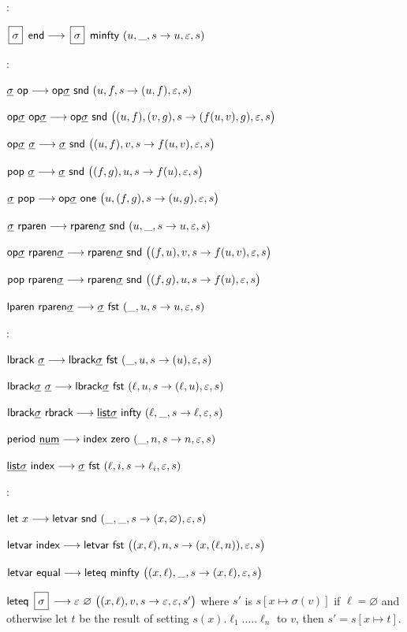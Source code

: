 \documentclass{llncs}
\begin{document}
:
\blist
    \item $\isig\ \eend \longto \isig\ \minfty\ (u,\_,s\to u,\epsilon,s)$
\elist

:
\blist
    \item $\tsig\ \op \longto \op\tsig\ \snd\ (u,f,s\to(u,f),\epsilon,s)$
    \item $\op\tsig\ \op\tsig \longto \op\tsig\ \snd\ \bigl((u,f),(v,g),s\to (f(u,v),g),\epsilon,s\bigr)$
    \item $\op\tsig\ \tsig \longto \tsig\ \snd\ \bigl((u,f),v,s\to f(u,v),\epsilon,s\bigr)$
    \item $\Pop\ \tsig \longto \tsig\ \snd\ \bigl((f,g),u,s\to f(u),\epsilon,s\bigr)$
    \item $\tsig\ \Pop \longto \op\tsig\ {\sf one}\ \bigl(u,(f,g),s\to(u,g),\epsilon,s\bigr)$
    \item $\tsig\ \rparen \longto \rparen\tsig\ \snd\ (u,\_,s\to u,\epsilon,s)$
    \item $\textsf{op}{\underline{\mathsf{\sigma}}}\ \textsf{rparen}{\underline{\mathsf{\sigma}}} \longrightarrow \textsf{rparen}{\underline{\mathsf{\sigma}}}\ \mathsf{snd}\ \bigl((f,u),v,s\to f(u,v),\varepsilon,s\bigr)$
    \item $\Pop\ \rparen\tsig \longto \rparen\tsig\ \snd\ \bigl((f,g),u,s\to f(u),\epsilon,s\bigr)$
    \item $\lparen\ \rparen\tsig \longto \tsig\ \fst\ (\_,u,s\to u,\epsilon,s)$
\elist

:
\blist
    \item $\Lbrack\ \tsig \longto \Lbrack\tsig\ \fst\ (\_,u,s\to (u),\epsilon,s)$
    \item $\Lbrack\tsig\ \tsig \longto \Lbrack\tsig\ \fst\ (\ell,u,s\to (\ell,u),\epsilon,s)$
    \item $\Lbrack\tsig\ \Rbrack \longto \List\tsig\ \pinfty\ (\ell,\_,s\to\ell,\epsilon,s)$
    \item $\period\ \num \longto \index\ \zero\ (\_,n,s\to n,\epsilon,s)$
    \item $\List\tsig\ \index \longto \tsig\ \fst\ (\ell,i,s\to \ell_i,\epsilon,s)$
\elist

:
\blist
    \item $\lett\ x \longto \letvar\ \snd\ (\_,\_,s\to(x,\varnothing),\epsilon,s)$
    \item $\letvar\ \index \longto \letvar\ \fst\ \bigl((x,\ell),n,s\to(x,(\ell,n)),\epsilon,s\bigr)$
    \item $\letvar\ \equal \longto \leteq\ \minfty\ \bigl((x,\ell),\_,s\to(x,\ell),\epsilon,s\bigr)$
    \item $\leteq\ \isig \longto \epsilon\ \varnothing\ \bigl((x,\ell),v,s\to\epsilon,\epsilon,s'\bigr)$ where $s'$ is $s[x\mapsto\sigma(v)]$ if $\ell=\varnothing$ and otherwise let $t$ be the result of
        setting $s(x).\ell_1.\dots.\ell_n$ to $v$, then $s'=s[x\mapsto t]$.
\elist
\end{document}
